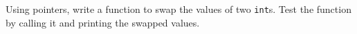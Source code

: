 %
%
\begin{question}\label{qst:swap two value with pointers}
Using pointers, write a function to swap the values of two
\verb|int|s. Test the function by calling it and printing the swapped values.
\end{question}
